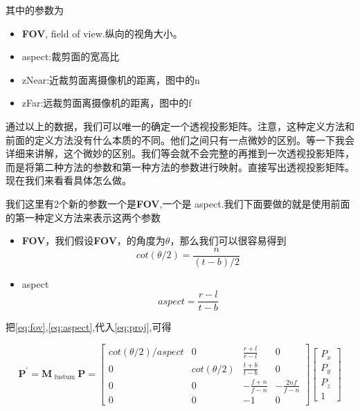\documentclass{article} \usepackage{braket} \usepackage{amsmath,amssymb} \usepackage{geometry} \usepackage{graphicx} \usepackage{braket} \usepackage{bm}\usepackage{hyperref} \usepackage{CJKutf8}
\begin{document}
\begin{CJK}{UTF8}{gbsn}
  其中的参数为
  \begin{itemize}
  \item \textbf{FOV}, field of view.纵向的视角大小。
  \item aspect:裁剪面的宽高比
  \item zNear:近裁剪面离摄像机的距离，图中的n
  \item zFar:远裁剪面离摄像机的距离，图中的f    
  \end{itemize}

  通过以上的数据，我们可以唯一的确定一个透视投影矩阵。注意，这种定义方法和前面的定义方法没有什么本质的不同。他们之间只有一点微妙的区别。等一下我会详细来讲解，这个微妙的区别。我们等会就不会完整的再推到一次透视投影矩阵，而是将第二种方法的参数和第一种方法的参数进行映射。直接写出透视投影矩阵。现在我们来看看具体怎么做。

  我们这里有2个新的参数一个是\textbf{FOV},一个是 aspect.我们下面要做的就是使用前面的第一种定义方法来表示这两个参数
  \begin{itemize}
  \item \textbf{FOV}，我们假设\textbf{FOV}，的角度为$\theta$，那么我们可以很容易得到
    \begin{equation}
      \label{eq:fov}
      cot(\theta/2)=\frac{n}{(t-b)/2}
    \end{equation}
  \item aspect
    \begin{equation}
      \label{eq:aspect}
      aspect = \frac{r-l}{t-b}
    \end{equation}
  \end{itemize}

  把\eqref{eq:fov},\eqref{eq:aspect},代入\eqref{eq:proj},可得

  \begin{equation}
    \label{eq:proj_fov}
        \mathbf{P}^{\prime}=\mathbf{M}_{\text { fustum }} \mathbf{P}=
    \left[
      \begin{array}{cccc}
        {cot(\theta/2)/aspect} & {0} & {\frac{r+l}{r-l}} & {0} \\
        {0} & {cot(\theta/2)} & {\frac{t+b}{t-b}} & {0} \\
        {0} & {0} & {-\frac{f+n}{f-n}} & {-\frac{2 n f}{f-n}} \\
        {0} & {0} & {-1} & {0}
      \end{array}\right]
    \left[
      \begin{array}{c}{P_{x}} \\
        {P_{y}} \\
        {P_{z}}
        \\ {1}
      \end{array}
    \right]
  \end{equation}


\end{CJK}
\end{document}
